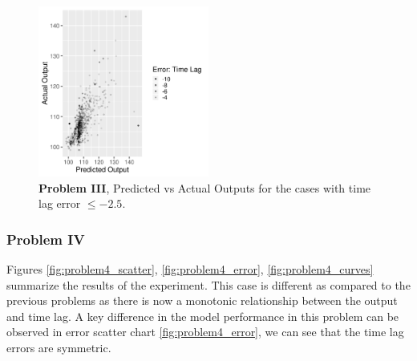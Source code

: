 \documentclass[envcountsect,runningheads]{llncs}
\theoremstyle{etoile}
\begin{document}
\begin{figure}[h]
\vspace{.3in}
\centerline{\includegraphics[width=0.5\textwidth]{figures/exp3_lag_error_jus.png}}
\vspace{.3in}
\caption{\textbf{Problem III}, Predicted vs Actual Outputs for the cases with time lag error $\leq -2.5$.}
\label{fig:problem3_lag_error_jus}
\end{figure}





\subsubsection{Problem IV}

Figures \ref{fig:problem4_scatter}, \ref{fig:problem4_error}, \ref{fig:problem4_curves} summarize 
the results of the experiment. This case is different as compared to the previous problems as there 
is now a monotonic relationship between the output and time lag. A key difference in the model 
performance in this problem can be observed in error scatter chart \ref{fig:problem4_error}, 
we can see that the time lag errors are symmetric.
\end{document}
